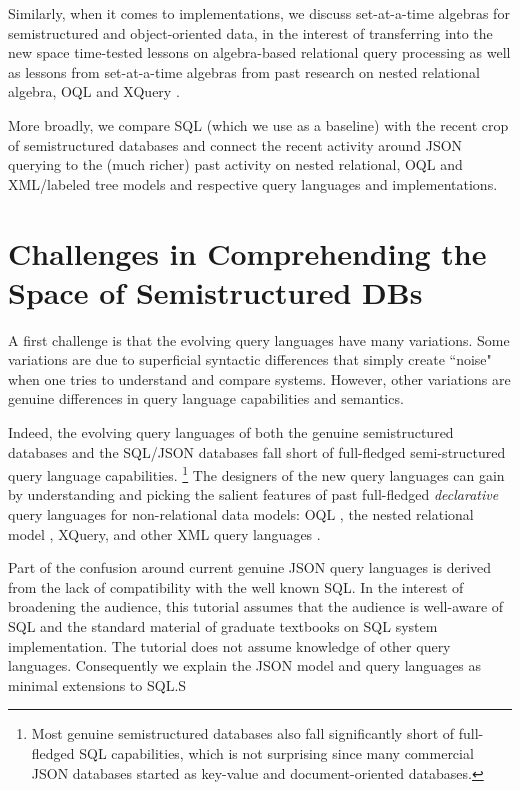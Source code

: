 Similarly, when it comes to implementations, we discuss set-at-a-time algebras for semistructured and object-oriented data, in the interest of transferring into the new space time-tested lessons on algebra-based relational query processing as well as lessons from set-at-a-time algebras from past research on nested relational algebra, OQL and XQuery \cite{GTP,XAT,OQL,SAL,DanaVLDB2004,Re06,MichielsTreePattern07,IoanaFQAS06,NicoleSerge,WiscMaier,Sartiani-Algebra,TAX,Enosys,Timber,NatixVLDBJ,Rainbow}. 

More broadly, we compare SQL (which we use as a baseline) with the recent crop of semistructured databases and connect the recent activity around JSON querying to the (much richer) past activity on nested relational, OQL and XML/labeled tree models and respective query languages and implementations. 

\section{Challenges in Comprehending the Space of Semistructured DBs}
A first challenge is that the evolving query languages have many variations. Some variations are due to superficial syntactic differences that simply create ``noise" when one tries to understand and compare systems. However, other variations are genuine differences in query language capabilities and semantics.

Indeed, the evolving query languages of both the genuine semistructured databases and the SQL/JSON databases fall short of full-fledged semi-structured query language capabilities.%
\footnote{Most genuine semistructured databases also fall significantly short of full-fledged SQL capabilities, which is not surprising since many commercial JSON databases started as key-value and document-oriented databases.}
The designers of the new query languages can gain by understanding and picking the salient features of past full-fledged \textit{declarative} query languages for non-relational data models: OQL \cite{oql-dbpl-1989}, the nested relational model \cite{nest-unnest-pods-1982,nested-relational-vldb-1988,nested-relational-workshop-lncs-1989}, 
XQuery, and other XML query languages \cite{xquery-3.0-w3c-2013,xml-ql-computer-networks-1999,xml-query-language-survey-sigmod-record-2000}.

Part of the confusion around current genuine JSON query languages is derived from the lack of compatibility with the well known SQL. In the interest of broadening the audience, this tutorial assumes that the audience is well-aware of SQL and the standard material of graduate textbooks on SQL system implementation. The tutorial does not assume knowledge of other query languages. Consequently we explain the JSON model and query languages as minimal extensions to SQL.S

